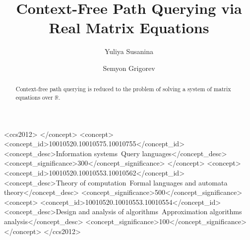 \documentclass[sigconf]{acmart}
\begin{document}
\title{Context-Free Path Querying via Real Matrix Equations}

\author{Yuliya Susanina}

\author{Semyon Grigorev}



\begin{abstract}
  Context-free path querying is reduced to the problem of solving a system of matrix equations over $\mathbb{R}$.
\end{abstract}

\begin{CCSXML}
<ccs2012>
 </concept>
 <concept>
  <concept_id>10010520.10010575.10010755</concept_id>
  <concept_desc>Information systems~Query languages</concept_desc>
  <concept_significance>300</concept_significance>
 </concept>
 <concept>
  <concept_id>10010520.10010553.10010562</concept_id>
  <concept_desc>Theory of computation~Formal languages and automata theory</concept_desc>
  <concept_significance>500</concept_significance>
 <concept>
  <concept_id>10010520.10010553.10010554</concept_id>
  <concept_desc>Design and analysis of algorithms~Approximation algorithms analysis</concept_desc>
  <concept_significance>100</concept_significance>
 </concept>
</ccs2012>
\end{CCSXML}




\maketitle
\end{document}
